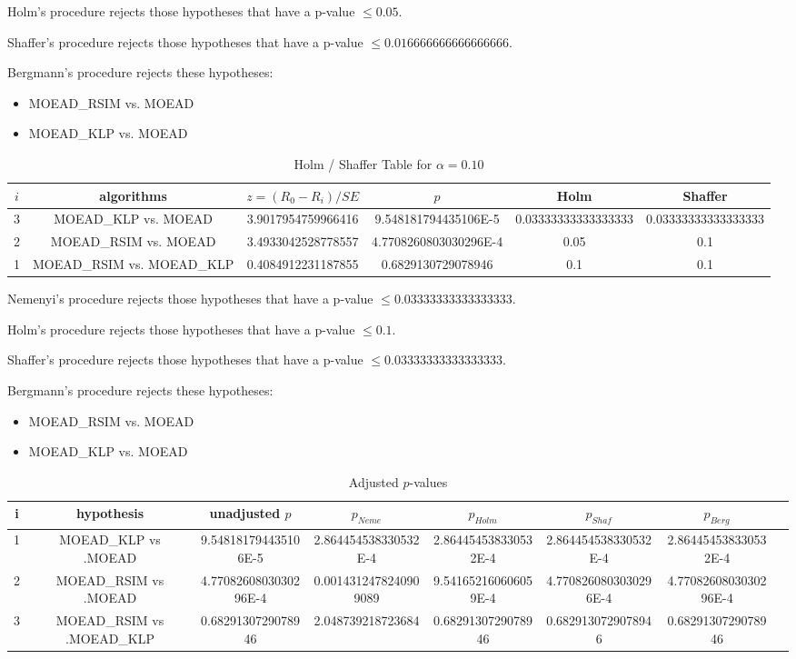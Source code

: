 \documentclass[a4paper,10pt]{article}
\begin{document}
\begin{landscape}
Holm's procedure rejects those hypotheses that have a p-value $\le0.05$.


Shaffer's procedure rejects those hypotheses that have a p-value $\le0.016666666666666666$.


Bergmann's procedure rejects these hypotheses:


\begin{itemize}


\item MOEAD_RSIM vs. MOEAD
\item MOEAD_KLP vs. MOEAD
\end{itemize}


\begin{table}[!htp]
\centering\tiny
\caption{Holm / Shaffer Table for $\alpha=0.10$}
\begin{tabular}{cccccc}
$i$&algorithms&$z=(R_0 - R_i)/SE$&$p$&Holm&Shaffer\\
\hline
3&MOEAD_KLP vs. MOEAD&3.9017954759966416&9.548181794435106E-5&0.03333333333333333&0.03333333333333333\\
2&MOEAD_RSIM vs. MOEAD&3.4933042528778557&4.7708260803030296E-4&0.05&0.1\\
1&MOEAD_RSIM vs. MOEAD_KLP&0.4084912231187855&0.6829130729078946&0.1&0.1\\
\hline
\end{tabular}
\end{table}
Nemenyi's procedure rejects those hypotheses that have a p-value $\le0.03333333333333333$.


Holm's procedure rejects those hypotheses that have a p-value $\le0.1$.


Shaffer's procedure rejects those hypotheses that have a p-value $\le0.03333333333333333$.


Bergmann's procedure rejects these hypotheses:


\begin{itemize}


\item MOEAD_RSIM vs. MOEAD
\item MOEAD_KLP vs. MOEAD
\end{itemize}


\begin{table}[!htp]
\centering\tiny
\caption{Adjusted $p$-values}
\begin{tabular}{cccccccc}
i&hypothesis&unadjusted $p$&$p_{Neme}$&$p_{Holm}$&$p_{Shaf}$&$p_{Berg}$\\
\hline
1&MOEAD_KLP vs .MOEAD&9.548181794435106E-5&2.864454538330532E-4&2.864454538330532E-4&2.864454538330532E-4&2.864454538330532E-4\\
2&MOEAD_RSIM vs .MOEAD&4.7708260803030296E-4&0.0014312478240909089&9.541652160606059E-4&4.7708260803030296E-4&4.7708260803030296E-4\\
3&MOEAD_RSIM vs .MOEAD_KLP&0.6829130729078946&2.048739218723684&0.6829130729078946&0.6829130729078946&0.6829130729078946\\
\hline
\end{tabular}
\end{table}

\end{landscape}
\end{document}

